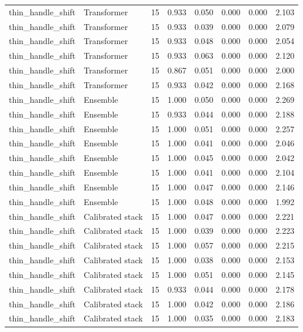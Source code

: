 {\begin{longtable}{llrrrrrr}
thin\_handle\_shift & Transformer & 15 & 0.933 & 0.050 & 0.000 & 0.000 & 2.103 \\
thin\_handle\_shift & Transformer & 15 & 0.933 & 0.039 & 0.000 & 0.000 & 2.079 \\
thin\_handle\_shift & Transformer & 15 & 0.933 & 0.048 & 0.000 & 0.000 & 2.054 \\
thin\_handle\_shift & Transformer & 15 & 0.933 & 0.063 & 0.000 & 0.000 & 2.120 \\
thin\_handle\_shift & Transformer & 15 & 0.867 & 0.051 & 0.000 & 0.000 & 2.000 \\
thin\_handle\_shift & Transformer & 15 & 0.933 & 0.042 & 0.000 & 0.000 & 2.168 \\
thin\_handle\_shift & Ensemble & 15 & 1.000 & 0.050 & 0.000 & 0.000 & 2.269 \\
thin\_handle\_shift & Ensemble & 15 & 0.933 & 0.044 & 0.000 & 0.000 & 2.188 \\
thin\_handle\_shift & Ensemble & 15 & 1.000 & 0.051 & 0.000 & 0.000 & 2.257 \\
thin\_handle\_shift & Ensemble & 15 & 1.000 & 0.041 & 0.000 & 0.000 & 2.046 \\
thin\_handle\_shift & Ensemble & 15 & 1.000 & 0.045 & 0.000 & 0.000 & 2.042 \\
thin\_handle\_shift & Ensemble & 15 & 1.000 & 0.041 & 0.000 & 0.000 & 2.104 \\
thin\_handle\_shift & Ensemble & 15 & 1.000 & 0.047 & 0.000 & 0.000 & 2.146 \\
thin\_handle\_shift & Ensemble & 15 & 1.000 & 0.048 & 0.000 & 0.000 & 1.992 \\
thin\_handle\_shift & Calibrated stack & 15 & 1.000 & 0.047 & 0.000 & 0.000 & 2.221 \\
thin\_handle\_shift & Calibrated stack & 15 & 1.000 & 0.039 & 0.000 & 0.000 & 2.223 \\
thin\_handle\_shift & Calibrated stack & 15 & 1.000 & 0.057 & 0.000 & 0.000 & 2.215 \\
thin\_handle\_shift & Calibrated stack & 15 & 1.000 & 0.038 & 0.000 & 0.000 & 2.153 \\
thin\_handle\_shift & Calibrated stack & 15 & 1.000 & 0.051 & 0.000 & 0.000 & 2.145 \\
thin\_handle\_shift & Calibrated stack & 15 & 0.933 & 0.044 & 0.000 & 0.000 & 2.178 \\
thin\_handle\_shift & Calibrated stack & 15 & 1.000 & 0.042 & 0.000 & 0.000 & 2.186 \\
thin\_handle\_shift & Calibrated stack & 15 & 1.000 & 0.035 & 0.000 & 0.000 & 2.183 \\

\end{longtable}}
